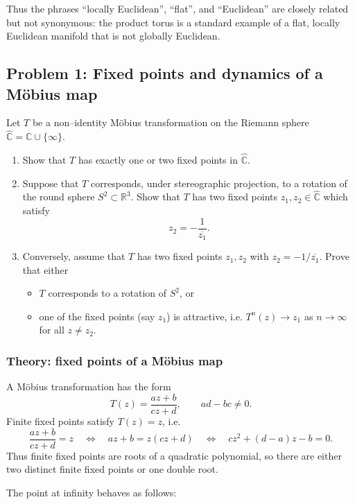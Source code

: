 \documentclass[12pt,a4paper]{article}
\theoremstyle{plain}
\theoremstyle{definition}      %
\begin{document}
Thus the phrases ``locally Euclidean'', ``flat'', and ``Euclidean'' are
closely related but not synonymous: the product torus is a standard
example of a flat, locally Euclidean manifold that is not globally
Euclidean.

\subsection*{Problem 1: Fixed points and dynamics of a M\"obius map}

Let $T$ be a non–identity M\"obius transformation on the Riemann sphere
$\widehat{\mathbb{C}} = \mathbb{C}\cup\{\infty\}$.

\begin{enumerate}
	\item Show that $T$ has exactly one or two fixed points in
	$\widehat{\mathbb{C}}$.
	\item Suppose that $T$ corresponds, under stereographic projection, to a
	rotation of the round sphere $S^{2}\subset\mathbb{R}^{3}$.  Show that
	$T$ has two fixed points $z_{1},z_{2}\in\widehat{\mathbb{C}}$ which
	satisfy
	\[
	z_{2} = -\frac{1}{\overline{z_{1}}}.
	\]
	\item Conversely, assume that $T$ has two fixed points $z_{1},z_{2}$ with
	$z_{2} = -1/\overline{z_{1}}$.  Prove that either
	\begin{itemize}
		\item $T$ corresponds to a rotation of $S^{2}$, or
		\item one of the fixed points (say $z_{1}$) is attractive, i.e.
		$T^{n}(z)\to z_{1}$ as $n\to\infty$ for all
		$z\neq z_{2}$.
	\end{itemize}
\end{enumerate}

\subsubsection*{Theory: fixed points of a M\"obius map}

A M\"obius transformation has the form
\[
T(z) = \frac{az+b}{cz+d}, \qquad ad-bc\neq 0.
\]
Finite fixed points satisfy $T(z)=z$, i.e.
\[
\frac{az+b}{cz+d} = z
\quad\Longleftrightarrow\quad
az+b = z(cz+d)
\quad\Longleftrightarrow\quad
cz^{2} + (d-a)z - b = 0.
\]
Thus finite fixed points are roots of a quadratic polynomial, so there are
either two distinct finite fixed points or one double root.

The point at infinity behaves as follows:
\end{document}
